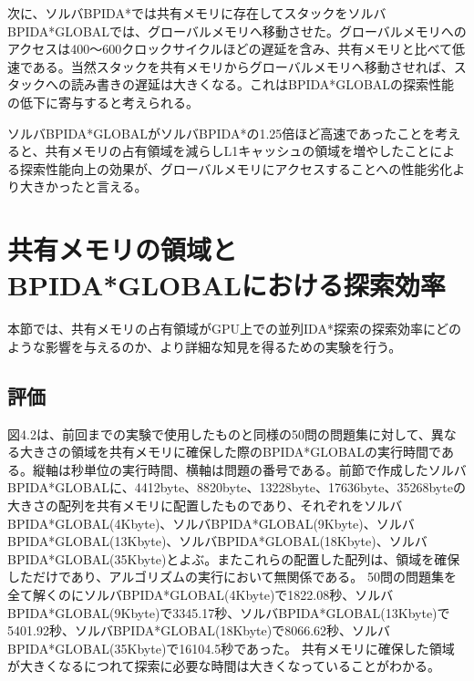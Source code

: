 \documentclass[a4paper,11pt,oneside,openany]{jsbook}
\begin{document}
次に、ソルバBPIDA*では共有メモリに存在してスタックをソルバBPIDA*GLOBALでは、グローバルメモリへ移動させた。グローバルメモリへのアクセスは400～600クロックサイクルほどの遅延を含み、共有メモリと比べて低速である。当然スタックを共有メモリからグローバルメモリへ移動させれば、スタックへの読み書きの遅延は大きくなる。これはBPIDA*GLOBALの探索性能の低下に寄与すると考えられる。

ソルバBPIDA*GLOBALがソルバBPIDA*の1.25倍ほど高速であったことを考えると、共有メモリの占有領域を減らしL1キャッシュの領域を増やしたことによる探索性能向上の効果が、グローバルメモリにアクセスすることへの性能劣化より大きかったと言える。








\section{共有メモリの領域とBPIDA*GLOBALにおける探索効率}
本節では、共有メモリの占有領域がGPU上での並列IDA*探索の探索効率にどのような影響を与えるのか、より詳細な知見を得るための実験を行う。


\subsection{評価}
図4.2は、前回までの実験で使用したものと同様の50問の問題集に対して、異なる大きさの領域を共有メモリに確保した際のBPIDA*GLOBALの実行時間である。縦軸は秒単位の実行時間、横軸は問題の番号である。前節で作成したソルバBPIDA*GLOBALに、4412byte、8820byte、13228byte、17636byte、35268byteの大きさの配列を共有メモリに配置したものであり、それぞれをソルバBPIDA*GLOBAL(4Kbyte)、ソルバBPIDA*GLOBAL(9Kbyte)、ソルバBPIDA*GLOBAL(13Kbyte)、ソルバBPIDA*GLOBAL(18Kbyte)、ソルバBPIDA*GLOBAL(35Kbyte)とよぶ。またこれらの配置した配列は、領域を確保しただけであり、アルゴリズムの実行において無関係である。
50問の問題集を全て解くのにソルバBPIDA*GLOBAL(4Kbyte)で1822.08秒、ソルバBPIDA*GLOBAL(9Kbyte)で3345.17秒、ソルバBPIDA*GLOBAL(13Kbyte)で5401.92秒、ソルバBPIDA*GLOBAL(18Kbyte)で8066.62秒、ソルバBPIDA*GLOBAL(35Kbyte)で16104.5秒であった。
共有メモリに確保した領域が大きくなるにつれて探索に必要な時間は大きくなっていることがわかる。
\end{document}
